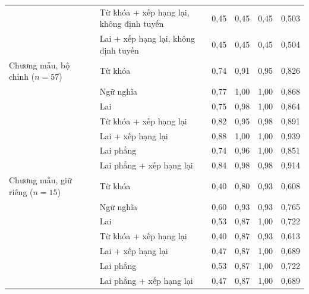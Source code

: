 \begin{tabular}{@{}llrrrr@{}}
 & Từ khóa + xếp hạng lại, không định tuyến & 0,45 & 0,45 & 0,45 & 0,503 \\
 & Lai + xếp hạng lại, không định tuyến & 0,45 & 0,45 & 0,45 & 0,504 \\
\midrule
Chương mẫu, bộ chỉnh ($n=57$) & Từ khóa & 0,74 & 0,91 & 0,95 & 0,826 \\
 & Ngữ nghĩa & 0,77 & 1,00 & 1,00 & 0,868 \\
 & Lai & 0,75 & 0,98 & 1,00 & 0,864 \\
 & Từ khóa + xếp hạng lại & 0,82 & 0,95 & 0,98 & 0,891 \\
 & Lai + xếp hạng lại & 0,88 & 1,00 & 1,00 & 0,939 \\
 & Lai phẳng & 0,74 & 0,96 & 1,00 & 0,851 \\
 & Lai phẳng + xếp hạng lại & 0,84 & 0,98 & 0,98 & 0,914 \\
\midrule
Chương mẫu, giữ riêng ($n=15$) & Từ khóa & 0,40 & 0,80 & 0,93 & 0,608 \\
 & Ngữ nghĩa & 0,60 & 0,93 & 0,93 & 0,765 \\
 & Lai & 0,53 & 0,87 & 1,00 & 0,722 \\
 & Từ khóa + xếp hạng lại & 0,40 & 0,87 & 0,93 & 0,613 \\
 & Lai + xếp hạng lại & 0,47 & 0,87 & 1,00 & 0,689 \\
 & Lai phẳng & 0,53 & 0,87 & 1,00 & 0,722 \\
 & Lai phẳng + xếp hạng lại & 0,47 & 0,87 & 1,00 & 0,689 \\
\bottomrule
\end{tabular}
